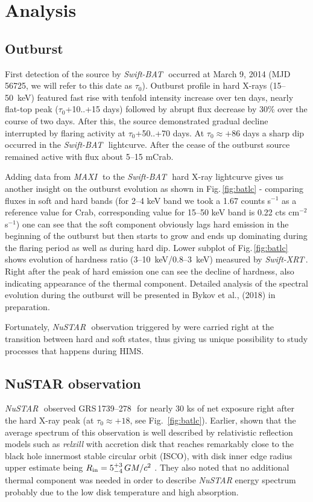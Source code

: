 \documentclass[a4paper,fleqn,usenatbib]{mnras}
\def\grs{{GRS\,1739--278\,}}
\def\swiftx{{\em Swift-XRT\,}}
\def\swiftb{{\em Swift-BAT\,}}
\def\nustar{{\em NuSTAR\,}}
\def\maxi{{\em MAXI\,}}
\begin{document}
\section{Analysis}
\subsection{Outburst}
First detection of the source by \swiftb\, \citep{krimm14_atel} occurred at March 9, 2014 (MJD 56725, we will refer to this date as $\tau_{0}$). 
Outburst profile in hard X-rays (15--50~keV) featured fast rise with tenfold intensity increase over ten days, nearly flat-top peak ($\tau_{0}$+10..+15 days) followed by abrupt flux decrease by 30\% over the course of two days.
After this, the source demonstrated gradual decline interrupted by flaring activity at $\tau_{0}$+50..+70 days. 
At $\tau_{0} \approx +86$ days a sharp dip occurred in the \swiftb\ lightcurve. 
After the cease of the outburst source remained active with flux about 5--15 mCrab. 

Adding data from \maxi\, to the \swiftb\, hard X-ray lightcurve gives us another insight on the outburst evolution as shown in Fig.\,\ref{fig:batlc} - comparing fluxes in soft and hard bands (for 2--4 keV band we took a 1.67 counts s$^{-1}$ as a reference value for Crab, corresponding value for 15--50 keV band is 0.22 cts cm$^{-2}$ s$^{-1}$) one can see that the soft component obviously lags hard emission in the beginning of the outburst but then starts to grow and ends up dominating during the flaring period as well as during hard dip. 
Lower subplot of Fig.\,\ref{fig:batlc} shows evolution of hardness ratio (3--10~keV/0.8--3~keV) measured by \swiftx. 
Right after the peak of hard emission one can see the decline of hardness, also indicating appearance of the thermal component.
Detailed analysis of the spectral evolution during the outburst will be presented in Bykov et al., (2018) in preparation.

Fortunately, \nustar\ observation triggered by \cite{miller15_nust} were carried right at the transition between hard and soft states, thus giving us unique possibility to study processes that happens during HIMS. 


\subsection{NuSTAR observation}
\label{sec:nust} 

\nustar\, observed \grs\ for nearly 30 ks of net exposure right after the hard X-ray peak (at $\tau_{0}\approx+18$, see Fig.~\ref{fig:batlc}). 
Earlier, \cite{miller15_nust} shown that the average spectrum of this observation is well described by relativistic reflection models such as {\it relxill} \citep{garcia14, dauser14,dauser16} with accretion disk that reaches remarkably close to the black hole innermost stable circular orbit (ISCO), with disk inner edge radius upper estimate being $R_{\rm in} = 5^{+3}_{-4}\, G M/c^{2}$ \citep{miller15_nust}. 
They also noted that no additional thermal component was needed in order to describe {\it NuSTAR} energy spectrum probably due to the low disk temperature and high absorption.
\end{document}
